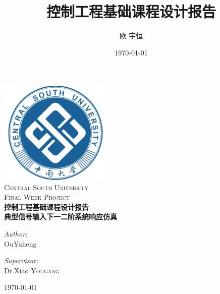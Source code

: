 \documentclass[12pt]{ctexart}
\title{控制工程基础课程设计报告}
\author{欧 宇恒}
\date{\today}
\begin{document}
	
\begin{titlepage}

    \begin{center}
    \includegraphics[width=0.4\textwidth]{./CSU.png}\\[1cm]    
    \textsc{\LARGE Central South University}\\[1.5cm]
    \textsc{\Large Final Week Project}\\[1.5cm]
    \textsc{\huge \bfseries 控制工程基础课程设计报告}\\[1cm]
    \textsc{ \bfseries 典型信号输入下一二阶系统响应仿真}\\[1.5cm]
    \begin{minipage}{0.4\textwidth}
    \begin{flushleft} \large
    \emph{Author:}\\
    OuYuheng
    \end{flushleft}
    \end{minipage}
    \begin{minipage}{0.4\textwidth}
    \begin{flushright} \large
    \emph{Supervisor:} \\
    Dr.Xiao \textsc{Yougang}
    \end{flushright}
    \end{minipage}
    \vfill
    {\large \today}
    \end{center}
    \end{titlepage}
\newpage
\tableofcontents
\newpage
\end{document}
